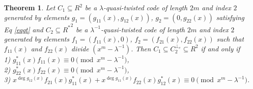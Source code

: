 \documentclass[12 pt]{extarticle}
\numberwithin{equation}{section}
\newtheorem{theorem}{Theorem}[section]
\theoremstyle{definition}
\begin{document}
\begin{theorem}\label{c1containc2e}
 Let $C_1\subseteq R^2$ be a $\lambda$-quasi-twisted code of length $2m$ and index $2$ generated by elements $g_1=(g_{11}(x),g_{12}(x))$, $g_2=(0,g_{22}(x))$ satisfying Eq \ref{eqqt} and $C_2\subseteq {R^*}^2$ be a $\lambda^{-1}$-quasi-twisted code of length $2m$ and index $2$ generated by elements $f_1=(f_{11}(x),0)$, $f_2=(f_{21}(x),f_{22}(x))$ such that $f_{11}(x)$ and $f_{22}(x)$ divide $(x^m-\lambda^{-1})$. Then $C_1\subseteq C_2^{\perp_e}\subseteq R^2$ if and only if\\
1) $g^*_{11}(x)f_{11}(x)\equiv 0\pmod{x^m-\lambda^{-1}}$,\\
 2) $g_{22}^*(x)f_{22}(x)\equiv 0\pmod{x^m-\lambda^{-1}}$,\\
 3) $x^{\deg g_{12}(x)}f_{21}(x) g^*_{11}(x)     +x^{\deg g_{11}(x)}f_{22}(x) g^*_{12}(x)\equiv 0\pmod{x^m-\lambda^{-1}}$.
\end{theorem}
\end{document}
